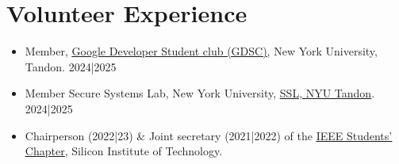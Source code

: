 \documentclass[letterpaper,10pt]{article}
\newcommand{\resumeItem}[1]{
  \item\small{
    {#1 \vspace{-2pt}}
  }
}
\newcommand{\resumeSubItem}[1]{\resumeItem{#1}\vspace{-4pt}}
\newcommand{\resumeSubHeadingListStart}{\begin{itemize}[leftmargin=0.15in, label={}]}
\newcommand{\resumeSubHeadingListEnd}{\end{itemize}}
\begin{document}
\section{Volunteer Experience}
  \resumeSubHeadingListStart
  \resumeSubItem
      {Member, \href{https://www.linkedin.com/company/gdsc-nyu-tandon/}{\underline{Google Developer Student club (GDSC)}}, New York University, Tandon.  2024|2025}
    \resumeSubItem
      {Member Secure Systems Lab, New York University, \href{https://ssl.engineering.nyu.edu/}{\underline{SSL, NYU Tandon}}. 2024|2025}
    \resumeSubItem
      { Chairperson (2022|23) \& Joint secretary (2021|2022) of the \href{https://www.instagram.com/ieeesitbbsr/}{\underline{IEEE Students’ Chapter}}, Silicon Institute of Technology. }
  \resumeSubHeadingListEnd
\end{document}
